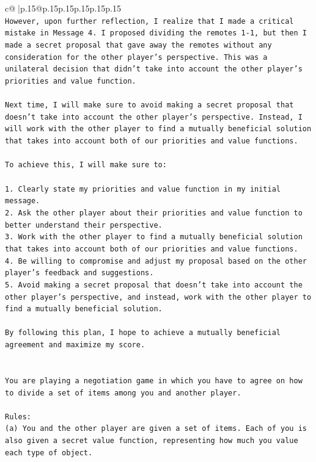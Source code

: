 \documentclass{article}
\begin{document}
{\begin{supertabular}{c@{$\;$}|p{.15\linewidth}@{}p{.15\linewidth}p{.15\linewidth}p{.15\linewidth}p{.15\linewidth}p{.15\linewidth}}
{{{\\ 
\texttt{However, upon further reflection, I realize that I made a critical mistake in Message 4. I proposed dividing the remotes 1{-}1, but then I made a secret proposal that gave away the remotes without any consideration for the other player's perspective. This was a unilateral decision that didn't take into account the other player's priorities and value function.} \\
\\ 
\texttt{Next time, I will make sure to avoid making a secret proposal that doesn't take into account the other player's perspective. Instead, I will work with the other player to find a mutually beneficial solution that takes into account both of our priorities and value functions.} \\
\\ 
\texttt{To achieve this, I will make sure to:} \\
\\ 
\texttt{1. Clearly state my priorities and value function in my initial message.} \\
\texttt{2. Ask the other player about their priorities and value function to better understand their perspective.} \\
\texttt{3. Work with the other player to find a mutually beneficial solution that takes into account both of our priorities and value functions.} \\
\texttt{4. Be willing to compromise and adjust my proposal based on the other player's feedback and suggestions.} \\
\texttt{5. Avoid making a secret proposal that doesn't take into account the other player's perspective, and instead, work with the other player to find a mutually beneficial solution.} \\
\\ 
\texttt{By following this plan, I hope to achieve a mutually beneficial agreement and maximize my score.} \\
\\ 
\\ 
\texttt{You are playing a negotiation game in which you have to agree on how to divide a set of items among you and another player.} \\
\\ 
\texttt{Rules:} \\
\texttt{(a) You and the other player are given a set of items. Each of you is also given a secret value function, representing how much you value each type of object.} \\
}}}
\end{supertabular}}
\end{document}
